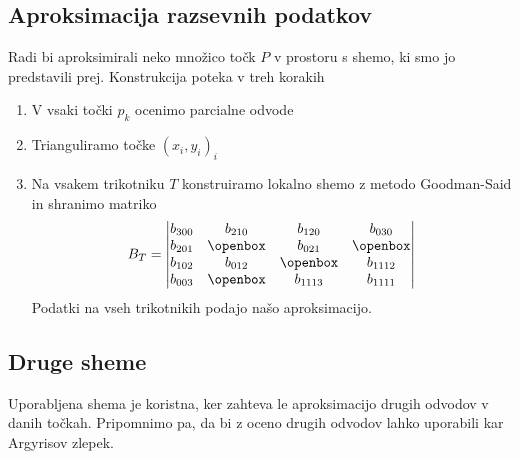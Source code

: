 \documentclass[ignorenonframetext]{beamer}
\let\frametitle\subsection %
\begin{document}
\begin{frame}
\frametitle{Aproksimacija razsevnih podatkov}
Radi bi aproksimirali neko množico točk $P$ v prostoru s shemo, ki smo jo predstavili prej.
Konstrukcija poteka v treh korakih
\begin{enumerate}
\item V vsaki točki $p_k$ ocenimo parcialne odvode
\item Trianguliramo točke $(x_i,y_i)_i$
\item Na vsakem trikotniku $T$ konstruiramo lokalno shemo z metodo Goodman-Said in shranimo matriko 
\begin{equation*}
B_T = 
\begin{vmatrix}
b_{300} & b_{210} & b_{120} & b_{030} \\
b_{201} & \openbox & b_{021} & \openbox  \\
b_{102} & b_{012} & \openbox & b_{1112} \\
b_{003} & \openbox & b_{1113} & b_{1111}
\end{vmatrix}
\end{equation*}
Podatki na vseh trikotnikih podajo našo aproksimacijo.
\end{enumerate}

\end{frame}

\begin{frame}
\frametitle{Druge sheme}
Uporabljena shema je koristna, ker zahteva le aproksimacijo drugih odvodov v danih točkah.
Pripomnimo pa, da bi z oceno drugih odvodov lahko uporabili kar Argyrisov zlepek.
\end{frame}
\end{document}
